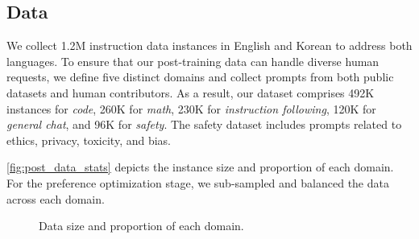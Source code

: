 \subsection{Data} \label{subsec:post-training-data}

We collect 1.2M instruction data instances in English and Korean to address both languages.
To ensure that our post-training data can handle diverse human requests, we define five distinct domains and collect prompts from both public datasets and human contributors.
As a result, our dataset comprises 492K instances for \textit{code}, 260K for \textit{math}, 230K for \textit{instruction following}, 120K for \textit{general chat}, and 96K for \textit{safety}.
The safety dataset includes prompts related to ethics, privacy, toxicity, and bias.

\autoref{fig:post_data_stats} depicts the instance size and proportion of each domain.
For the preference optimization stage, we sub-sampled and balanced the data across each domain.

\begin{figure}[h]
    \centering
    \hfill
    \caption{Data size and proportion of each domain.}
    \label{fig:post_data_stats}
\end{figure}

